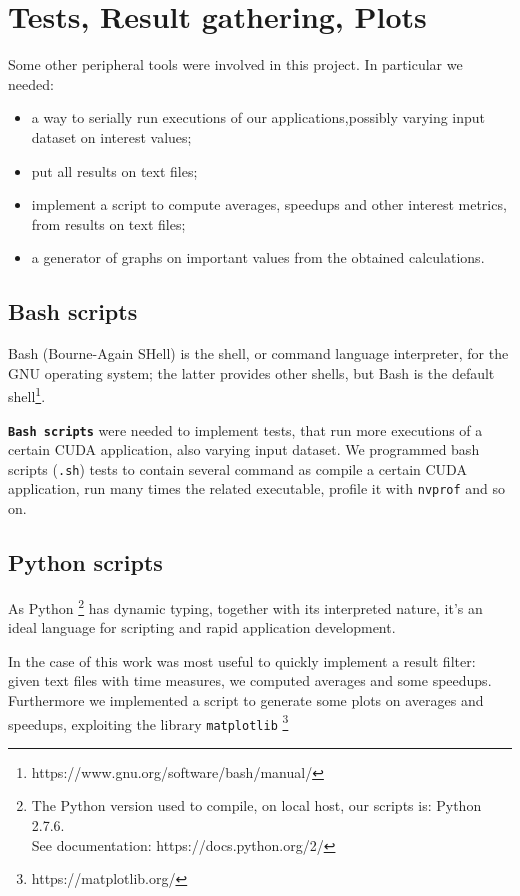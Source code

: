 \section{Tests, Result gathering, Plots}
Some other peripheral tools were involved in this project.
In particular we needed:
\begin{itemize}
	\item a way to serially run executions of our applications,possibly varying input dataset on interest values;
	\item put all results on text files;
	\item implement a script to compute averages, speedups and other interest metrics, from results on text files;
	\item a generator of graphs on important values from the obtained calculations.
\end{itemize}

\subsection{Bash scripts}
\label{subs:bash}
Bash (Bourne-Again SHell) is the shell, or command language interpreter, for the GNU operating system; the latter provides other shells, but Bash is the default  shell\footnote{https://www.gnu.org/software/bash/manual/}. 

\textbf{\texttt{Bash scripts}} were needed to implement tests, that run more executions of a certain CUDA application, also varying input dataset.
We programmed bash scripts (\texttt{.sh}) tests to contain several command as compile a certain CUDA application, run many times the related executable, profile it with \texttt{nvprof} and so on.

\subsection{Python scripts}
As Python \footnote{The Python version used to compile, on local host, our scripts is: Python 2.7.6.\\ See documentation: https://docs.python.org/2/} has dynamic typing, together with its interpreted nature, it's an ideal language for scripting and rapid application development.

In the case of this work was most useful to quickly implement a result filter: given text files with time measures, we computed averages and some speedups. \\
Furthermore we implemented a script to generate some plots on averages and speedups, exploiting the library \texttt{matplotlib} \footnote{https://matplotlib.org/}




